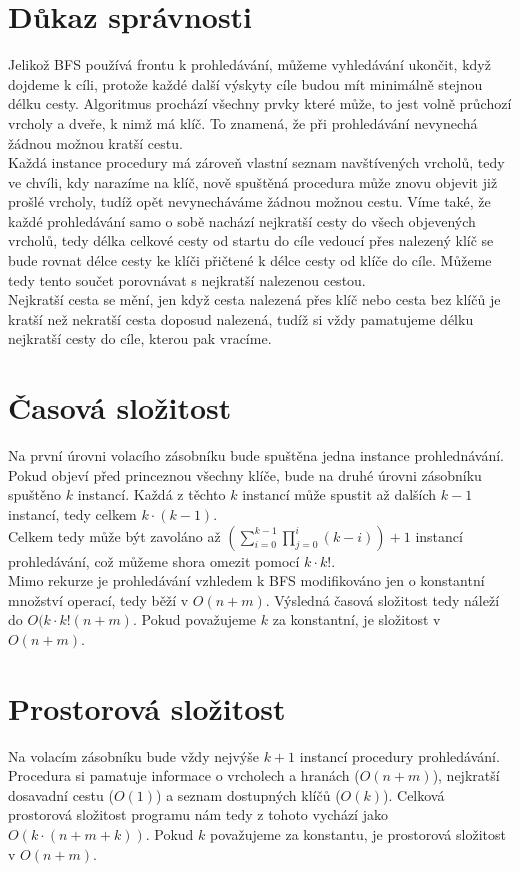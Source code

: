 \documentclass[11pt,a4paper]{article}
\begin{document}
\section{Důkaz správnosti}
Jelikož BFS používá frontu k prohledávání, můžeme vyhledávání ukončit, když dojdeme  k cíli, protože každé další výskyty cíle budou mít minimálně stejnou délku cesty. Algoritmus prochází všechny prvky které může, to jest volně průchozí vrcholy a dveře, k nimž má klíč. To znamená, že při prohledávání nevynechá žádnou možnou kratší cestu.\\

Každá instance procedury má zároveň vlastní seznam navštívených vrcholů, tedy ve chvíli, kdy narazíme na klíč, nově spuštěná procedura může znovu objevit již prošlé vrcholy, tudíž opět nevynecháváme žádnou možnou cestu. Víme také, že každé prohledávání samo o sobě nachází nejkratší cesty do všech objevených vrcholů, tedy délka celkové cesty od startu do cíle vedoucí přes nalezený klíč se bude rovnat délce cesty ke klíči přičtené k délce cesty od klíče do cíle. Můžeme tedy tento součet porovnávat s nejkratší nalezenou cestou.\\

Nejkratší cesta se mění, jen když cesta nalezená přes klíč nebo cesta bez klíčů je kratší než nekratší cesta doposud nalezená, tudíž si vždy pamatujeme délku nejkratší cesty do cíle, kterou pak vracíme. 

\section{Časová složitost}
Na první úrovni volacího zásobníku bude spuštěna jedna instance prohlednávání. Pokud objeví před princeznou všechny klíče, bude na druhé úrovni zásobníku spuštěno $k$ instancí. Každá z těchto $k$ instancí může spustit až dalších $k-1$ instancí, tedy celkem $k\cdot(k-1)$.\\

Celkem tedy může být zavoláno až $ \left(\sum_{i=0}^{k-1} \prod_{j=0}^i (k-i) \right) + 1$ instancí prohledávání, což můžeme shora omezit pomocí $k\cdot k!$.\\

Mimo rekurze je prohledávání vzhledem k BFS modifikováno jen o konstantní množství operací, tedy běží v $O(n+m)$. Výsledná časová složitost tedy náleží do $O(k\cdot k!(n+m)$. Pokud považujeme $k$ za konstantní, je složitost v $O(n+m)$.

\section{Prostorová složitost}
Na volacím zásobníku bude vždy nejvýše $k+1$ instancí procedury prohledávání. Procedura si pamatuje informace o vrcholech a hranách ($O(n+m)$), nejkratší dosavadní cestu ($O(1)$) a seznam dostupných klíčů ($O(k)$). Celková prostorová složitost programu nám tedy z tohoto vychází jako $O(k\cdot(n+m+k))$. Pokud $k$ považujeme za konstantu, je prostorová složitost v $O(n+m)$. 
\end{document}
